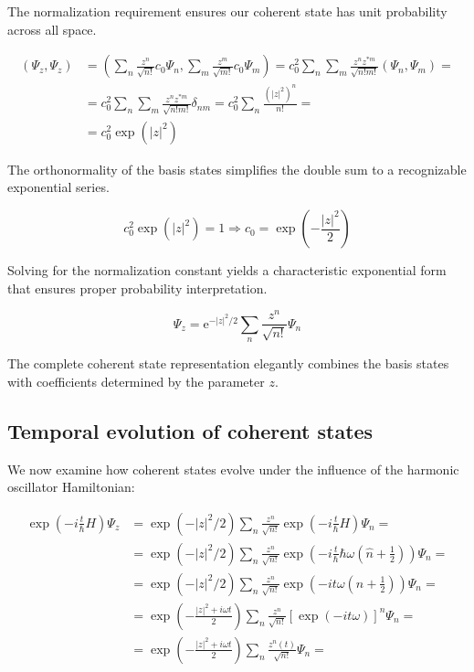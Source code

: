 \documentclass[italian]{HKNdocument}
\begin{document}
The normalization requirement ensures our coherent state has unit probability across all space.

\begin{align}
\left(\Psi_{z}, \Psi_{z}\right) & =\left(\sum_{n} \frac{z^{n}}{\sqrt{n!}} c_{0} \Psi_{n}, \sum_{m} \frac{z^{m}}{\sqrt{m!}} c_{0} \Psi_{m}\right)=c_{0}^{2} \sum_{n} \sum_{m} \frac{z^{n} z^{* m}}{\sqrt{n!m!}}\left(\Psi_{n}, \Psi_{m}\right)= \\
& =c_{0}^{2} \sum_{n} \sum_{m} \frac{z^{n} z^{* m}}{\sqrt{n!m!}} \delta_{n m}=c_{0}^{2} \sum_{n} \frac{\left(|z|^{2}\right)^{n}}{n!}= \\
& =c_{0}^{2} \exp \left(|z|^{2}\right) \label{eq:7.86}
\end{align}

The orthonormality of the basis states simplifies the double sum to a recognizable exponential series.

\begin{equation}
c_{0}^{2} \exp \left(|z|^{2}\right)=1 \Longrightarrow c_{0}=\exp \left(-\frac{|z|^{2}}{2}\right) \label{eq:7.87}
\end{equation}

Solving for the normalization constant yields a characteristic exponential form that ensures proper probability interpretation.

\begin{equation}
\Psi_{z}=\mathrm{e}^{-|z|^{2} / 2} \sum_{n} \frac{z^{n}}{\sqrt{n!}} \Psi_{n} \label{eq:7.88}
\end{equation}

The complete coherent state representation elegantly combines the basis states with coefficients determined by the parameter $z$.

\subsection{Temporal evolution of coherent states}
We now examine how coherent states evolve under the influence of the harmonic oscillator Hamiltonian:

\begin{align}
\exp \left(-i \frac{t}{\hbar} H\right) \Psi_{z} & =\exp \left(-|z|^{2} / 2\right) \sum_{n} \frac{z^{n}}{\sqrt{n!}} \exp \left(-i \frac{t}{\hbar} H\right) \Psi_{n}= \\
& =\exp \left(-|z|^{2} / 2\right) \sum_{n} \frac{z^{n}}{\sqrt{n!}} \exp \left(-i \frac{t}{\hbar} \hbar \omega\left(\hat{n}+\frac{1}{2}\right)\right) \Psi_{n}= \\
& =\exp \left(-|z|^{2} / 2\right) \sum_{n} \frac{z^{n}}{\sqrt{n!}} \exp \left(-i t \omega\left(n+\frac{1}{2}\right)\right) \Psi_{n}= \\
& =\exp \left(-\frac{|z|^{2}+i \omega t}{2}\right) \sum_{n} \frac{z^{n}}{\sqrt{n!}}[\exp (-i t \omega)]^{n} \Psi_{n}= \\
& =\exp \left(-\frac{|z|^{2}+i \omega t}{2}\right) \sum_{n} \frac{z^{n}(t)}{\sqrt{n!}} \Psi_{n}= \label{eq:7.89}
\end{align}
\end{document}
